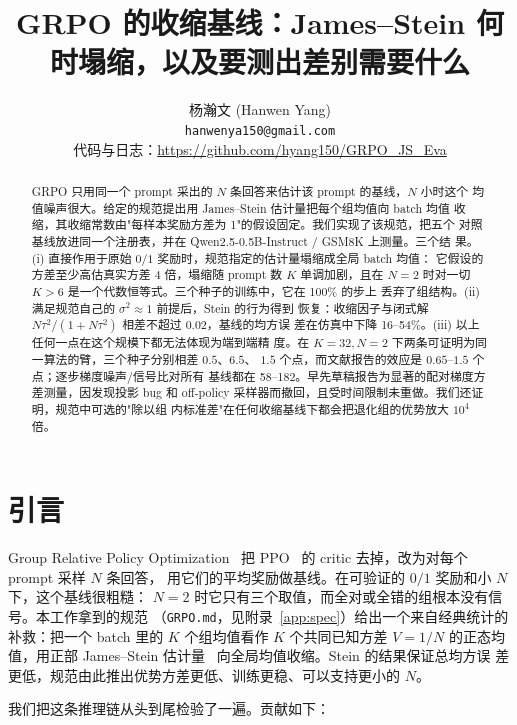 \documentclass{article}
\title{GRPO 的收缩基线：James--Stein 何时塌缩，以及要测出差别需要什么}
\author{杨瀚文 (Hanwen Yang)\\
\texttt{hanwenya150@gmail.com}\\
代码与日志：\url{https://github.com/hyang150/GRPO_JS_Eva}
}
\begin{document}
\maketitle

\begin{abstract}
GRPO 只用同一个 prompt 采出的 $N$ 条回答来估计该 prompt 的基线，$N$ 小时这个
均值噪声很大。给定的规范提出用 James--Stein 估计量把每个组均值向 batch 均值
收缩，其收缩常数由"每样本奖励方差为 1"的假设固定。我们实现了该规范，把五个
对照基线放进同一个注册表，并在 Qwen2.5-0.5B-Instruct / GSM8K 上测量。三个结
果。(i) 直接作用于原始 $0/1$ 奖励时，规范指定的估计量塌缩成全局 batch 均值：
它假设的方差至少高估真实方差 $4$ 倍，塌缩随 prompt 数 $K$ 单调加剧，且在
$N=2$ 时对一切 $K>6$ 是一个代数恒等式。三个种子的训练中，它在 100\% 的步上
丢弃了组结构。(ii) 满足规范自己的 $\sigma^2\approx1$ 前提后，Stein 的行为得到
恢复：收缩因子与闭式解 $N\tau^2/(1+N\tau^2)$ 相差不超过 $0.02$，基线的均方误
差在仿真中下降 16--54\%。(iii) 以上任何一点在这个规模下都无法体现为端到端精
度。在 $K=32,N=2$ 下两条可证明为同一算法的臂，三个种子分别相差 $0.5$、$6.5$、
$1.5$ 个点，而文献报告的效应是 $0.65$--$1.5$ 个点；逐步梯度噪声/信号比对所有
基线都在 58--182。早先草稿报告为显著的配对梯度方差测量，因发现投影 bug 和
off-policy 采样器而撤回，且受时间限制未重做。我们还证明，规范中可选的"除以组
内标准差"在任何收缩基线下都会把退化组的优势放大 $10^4$ 倍。
\end{abstract}

\section{引言}

Group Relative Policy Optimization~\citep{shao2024deepseekmath} 把
PPO~\citep{schulman2017ppo} 的 critic 去掉，改为对每个 prompt 采样 $N$ 条回答，
用它们的平均奖励做基线。在可验证的 $0/1$ 奖励和小 $N$ 下，这个基线很粗糙：
$N=2$ 时它只有三个取值，而全对或全错的组根本没有信号。本工作拿到的规范
（\texttt{GRPO.md}，见附录~\ref{app:spec}）给出一个来自经典统计的补救：把一个
batch 里的 $K$ 个组均值看作 $K$ 个共同已知方差 $V=1/N$ 的正态均值，用正部
James--Stein 估计量~\citep{james1961} 向全局均值收缩。Stein 的结果保证总均方误
差更低，规范由此推出优势方差更低、训练更稳、可以支持更小的 $N$。

我们把这条推理链从头到尾检验了一遍。贡献如下：
\end{document}
